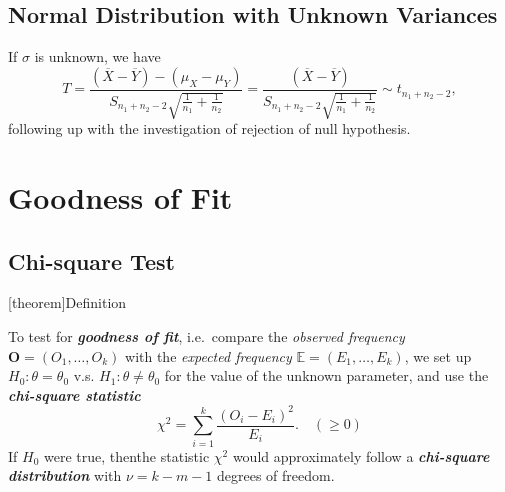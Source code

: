 \documentclass[12pt]{report}
\theoremstyle{definition}
\begin{document}
\subsection{Normal Distribution with Unknown Variances}

If $\sigma$ is unknown, we have
\[
    T=\frac{(\overline{X}-\overline{Y})-(\mu_X-\mu_Y)}
    {S_{n_1+n_2-2}\sqrt{\frac{1}{n_1}+\frac{1}{n_2}}}
    =\frac{(\overline{X}-\overline{Y})}
    {S_{n_1+n_2-2}\sqrt{\frac{1}{n_1}+\frac{1}{n_2}}}
    \sim t_{n_1+n_2-2},
\]
following up with the investigation of rejection of null hypothesis.

\section{Goodness of Fit}

\subsection{Chi-square Test}

[theorem]{Definition}
\begin{chi-square statistic}
    To test for \textbf{\emph{goodness of fit}}, i.e.\ compare the
    \emph{observed frequency} $\mathbf{O}=(O_1,\ldots,O_k)$ with the
    \emph{expected frequency} $\mathbb{E}=(E_1,\ldots,E_k)$, 
    we set up $H_0:\theta=\theta_0$ v.s. $H_1:\theta\neq\theta_0$ for the value
    of the unknown parameter, and use the \textbf{\emph{chi-square statistic}}
    \[
        \chi^2=\sum_{i=1}^{k} \frac{{(O_i-E_i)}^{2}}{E_i}. \quad(\ge 0)
    \]
    If $H_0$ were true, thenthe statistic $\chi^2$ would approximately follow a
    \textbf{\emph{chi-square distribution}} with $\nu=k-m-1$ degrees of freedom.
\end{chi-square statistic}
\end{document}
